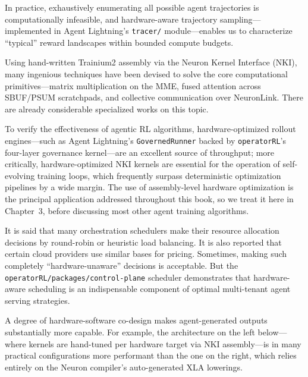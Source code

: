 \documentclass[12pt]{article}
\newcommand{\SBUF}{\textsc{SBUF}}                 %
\newcommand{\PSUM}{\textsc{PSUM}}                 %
\newcommand{\MME}{\textsc{MME}}                   %
\begin{document}
\medskip

\noindent  In practice, exhaustively enumerating all possible agent trajectories is computationally infeasible, and hardware-aware trajectory sampling---implemented in Agent Lightning's \texttt{tracer/} module---enables us to characterize ``typical'' reward landscapes within bounded compute budgets.

\medskip

\noindent Using hand-written Trainium2 assembly via the Neuron Kernel Interface (NKI), many ingenious techniques have been devised to solve the core computational primitives---matrix multiplication on the \MME{}, fused attention across \SBUF{}/\PSUM{} scratchpads, and collective communication over NeuronLink. There are already considerable specialized works on this topic.

\medskip

\noindent  To verify the effectiveness of agentic RL algorithms, hardware-optimized rollout engines---such as Agent Lightning's \texttt{GovernedRunner} backed by \texttt{operatorRL}'s four-layer governance kernel---are an excellent source of throughput; more critically, hardware-optimized NKI kernels are essential for the operation of self-evolving training loops, which frequently surpass deterministic optimization pipelines by a wide margin. The use of assembly-level hardware optimization is the principal application addressed throughout this book, so we treat it here in Chapter~3, before discussing most other agent training algorithms.

\medskip

\noindent  It is said that many orchestration schedulers make their resource allocation decisions by round-robin or heuristic load balancing. It is also reported that certain cloud providers use similar bases for pricing. Sometimes, making such completely ``hardware-unaware'' decisions is acceptable. But the \texttt{operatorRL/packages/control-plane} scheduler demonstrates that hardware-aware scheduling is an indispensable component of optimal multi-tenant agent serving strategies.

\medskip

\noindent A degree of hardware-software co-design makes agent-generated outputs substantially more capable. For example, the architecture on the left below---where kernels are hand-tuned per hardware target via NKI assembly---is in many practical configurations more performant than the one on the right, which relies entirely on the Neuron compiler's auto-generated XLA lowerings.
\end{document}

